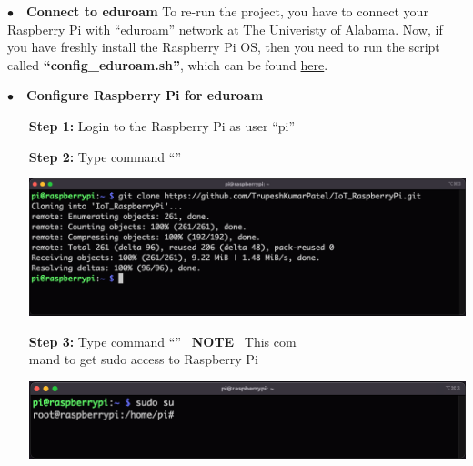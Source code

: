 \noindent$\bullet$~~\textbf{Connect to eduroam}	\label{sec:run-eduroam}
	 To re-run the project, you have to connect your Raspberry Pi with ``eduroam'' network at The Univeristy of Alabama. Now, if you have freshly install the Raspberry Pi OS, then you need to run the script called \textbf{``config\_eduroam.sh''}, which can be found \href{https://github.com/TrupeshKumarPatel/IoT_RaspberryPi/tree/main/source_code/eduroam_config}{here}. 
	 
\noindent$\bullet$~~\textbf{Configure Raspberry Pi for eduroam}
		\begin{itemize}[leftmargin=1.8cm]
			\item[\textbf{Step 1:}] Login to the Raspberry Pi as user ``pi'' %
			\item[\textbf{Step 2:}] Type command ``{\selectfont{git clone https://github\\.com/TrupeshKumarPatel/IoT\_RaspberryPi.\\git}}''\\
				\begin{minipage}{\textwidth}
					\vspace{2mm}
					\includegraphics[scale=0.17]{Images/raspberry_pi/eduroam_config/clone_git.png}
					\vspace{2mm}
				\end{minipage}
			\item[\textbf{Step 3:}] Type command ``{\selectfont{sudo su}}'' ~\danger\textbf{NOTE} ~This com\\mand to get sudo access to Raspberry Pi \danger\\
				\begin{minipage}{\textwidth}
					\vspace{2mm}
					\includegraphics[scale=0.2]{Images/raspberry_pi/eduroam_config/sudo_login.png}

\end{minipage}
\end{itemize}

